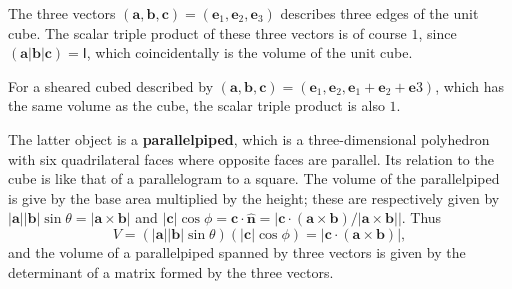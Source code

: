 \documentclass[letter-paper]{tufte-book}
\newenvironment{example}[1][Example]{\begin{trivlist}
\item[\hskip \labelsep {\bfseries #1}]}{\end{trivlist}}
\newcommand{\ab}{\boldsymbol{a}}
\newcommand{\bb}{\boldsymbol{b}}
\newcommand{\cb}{\boldsymbol{c}}
\newcommand{\eb}{\boldsymbol{e}}
\newcommand{\nb}{\boldsymbol{n}}
\newcommand\Def[1]{\textbf{#1}}
\begin{document}
\begin{example}
	The three vectors $(\ab,\bb,\cb)=(\eb_1,\eb_2,\eb_3)$ describes three edges
	of the unit cube. The scalar triple product of these three vectors is of
	course $1$, since $(\ab|\bb|\cb)=\mathsf{I}$, which coincidentally is the
	volume of the unit cube.
	
	For a sheared cubed described by
	$(\ab,\bb,\cb)=(\eb_1,\eb_2,\eb_1+\eb_2+\eb3)$, which has the same volume as
	the cube, the scalar triple product is also $1$.
\end{example}

The latter object is a \Def{parallelpiped}, which is a three-dimensional
polyhedron with six quadrilateral faces where opposite faces are parallel. Its
relation to the cube is like that of a parallelogram to a square. The volume of
the parallelpiped is give by the base area multiplied by the height; these are
respectively given by $|\ab||\bb|\sin\theta=|\ab\times\bb|$ and
$|\cb|\cos\phi=\cb\cdot\hat{\nb}=|\cb\cdot(\ab\times\bb)/|\ab\times\bb||$. Thus
\begin{equation*}
	V=(|\ab||\bb|\sin\theta)(|\cb|\cos\phi)=|\cb\cdot(\ab\times\bb)|,
\end{equation*}
and the volume of a parallelpiped spanned by three vectors is given by the
determinant of a matrix formed by the three vectors.
\end{document}
